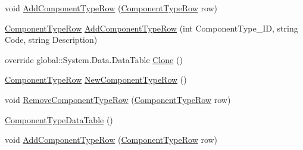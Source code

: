 \begin{DoxyCompactItemize}
\item 
void \hyperlink{class_env_int_1_1_win32_1_1_field_tech_1_1_manager_1_1_data_sets_1_1_guide_ware_mobile_data_set_1_1_component_type_data_table_a7bdbd50957f4f9ef5d2e7c75842bf215}{Add\+Component\+Type\+Row} (\hyperlink{class_env_int_1_1_win32_1_1_field_tech_1_1_manager_1_1_data_sets_1_1_guide_ware_mobile_data_set_1_1_component_type_row}{Component\+Type\+Row} row)
\item 
\hyperlink{class_env_int_1_1_win32_1_1_field_tech_1_1_manager_1_1_data_sets_1_1_guide_ware_mobile_data_set_1_1_component_type_row}{Component\+Type\+Row} \hyperlink{class_env_int_1_1_win32_1_1_field_tech_1_1_manager_1_1_data_sets_1_1_guide_ware_mobile_data_set_1_1_component_type_data_table_af9070dd91abe3423f1e0a03e14a335b4}{Add\+Component\+Type\+Row} (int Component\+Type\+\_\+\+I\+D, string Code, string Description)
\item 
override global\+::\+System.\+Data.\+Data\+Table \hyperlink{class_env_int_1_1_win32_1_1_field_tech_1_1_manager_1_1_data_sets_1_1_guide_ware_mobile_data_set_1_1_component_type_data_table_aee715d9b4b39977a3479231c4c5e7896}{Clone} ()
\item 
\hyperlink{class_env_int_1_1_win32_1_1_field_tech_1_1_manager_1_1_data_sets_1_1_guide_ware_mobile_data_set_1_1_component_type_row}{Component\+Type\+Row} \hyperlink{class_env_int_1_1_win32_1_1_field_tech_1_1_manager_1_1_data_sets_1_1_guide_ware_mobile_data_set_1_1_component_type_data_table_a0385abfa9e46a887f223d0a90205e450}{New\+Component\+Type\+Row} ()
\item 
void \hyperlink{class_env_int_1_1_win32_1_1_field_tech_1_1_manager_1_1_data_sets_1_1_guide_ware_mobile_data_set_1_1_component_type_data_table_a7b93e932720c53787be4833406918284}{Remove\+Component\+Type\+Row} (\hyperlink{class_env_int_1_1_win32_1_1_field_tech_1_1_manager_1_1_data_sets_1_1_guide_ware_mobile_data_set_1_1_component_type_row}{Component\+Type\+Row} row)
\item 
\hyperlink{class_env_int_1_1_win32_1_1_field_tech_1_1_manager_1_1_data_sets_1_1_guide_ware_mobile_data_set_1_1_component_type_data_table_a412c2968b4833e69d7d282db5364292e}{Component\+Type\+Data\+Table} ()
\item 
void \hyperlink{class_env_int_1_1_win32_1_1_field_tech_1_1_manager_1_1_data_sets_1_1_guide_ware_mobile_data_set_1_1_component_type_data_table_a7bdbd50957f4f9ef5d2e7c75842bf215}{Add\+Component\+Type\+Row} (\hyperlink{class_env_int_1_1_win32_1_1_field_tech_1_1_manager_1_1_data_sets_1_1_guide_ware_mobile_data_set_1_1_component_type_row}{Component\+Type\+Row} row)

\end{DoxyCompactItemize}
